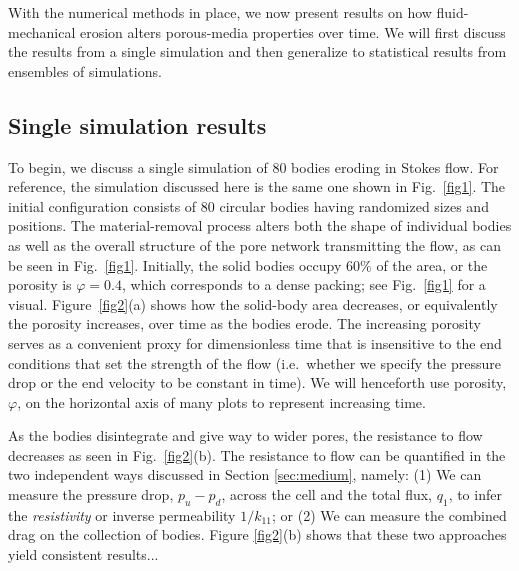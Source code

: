 \documentclass[3p]{elsarticle}
\newcommand{\vsp}[1]{\vspace{#1 pc} \noindent}
\newcommand{\nick}[1]{ {\color{red} #1} }
\newcommand{\pup}{p_u}
\newcommand{\pdn}{p_d}
\begin{document}
With the numerical methods in place, we now present results on how fluid-mechanical erosion alters porous-media properties over time. We will first discuss the results from a single simulation and then generalize to statistical results from ensembles of simulations.

\subsection{Single simulation results}

To begin, we discuss a single simulation of 80 bodies eroding in Stokes flow. For reference, the simulation discussed here is the same one shown in Fig.~\ref{fig1}. The initial configuration consists of 80 circular bodies having randomized sizes and positions. The material-removal process alters both the shape of individual bodies as well as the overall structure of the pore network transmitting the flow, as can be seen in Fig.~\ref{fig1}. Initially, the solid bodies occupy $60\%$ of the area, or the porosity is $\varphi = 0.4$, which corresponds to a dense packing; see Fig.~\ref{fig1} for a visual. Figure~\ref{fig2}(a) shows how the solid-body area decreases, or equivalently the porosity increases, over time as the bodies erode. The increasing porosity serves as a convenient proxy for dimensionless time that is insensitive to the end conditions that set the strength of the flow (i.e.~whether we specify the pressure drop or the end velocity to be constant in time). We will henceforth use porosity, $\varphi$, on the horizontal axis of many plots to represent increasing time.

As the bodies disintegrate and give way to wider pores, the resistance to flow decreases as seen in Fig.~\ref{fig2}(b). The resistance to flow can be quantified in the two independent ways discussed in Section \ref{sec:medium}, namely: (1) We can measure the pressure drop, $\pup - \pdn$, across the cell and the total flux, $q_1$, to infer the {\em resistivity} or inverse permeability $1/k_{11}$; or (2) We can measure the combined drag on the collection of bodies. Figure \ref{fig2}(b) shows that these two approaches yield consistent results...


\end{document}
